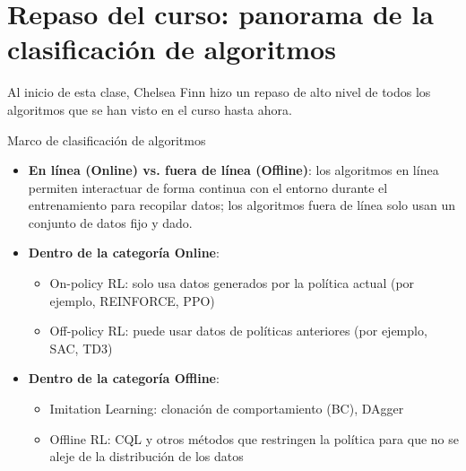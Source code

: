 \section{Repaso del curso: panorama de la clasificación de algoritmos}

Al inicio de esta clase, Chelsea Finn hizo un repaso de alto nivel de todos los algoritmos que se han visto en el curso hasta ahora.

\begin{importantbox}{Marco de clasificación de algoritmos}
\begin{itemize}
    \item \textbf{En línea (Online) vs. fuera de línea (Offline)}: los algoritmos en línea permiten interactuar de forma continua con el entorno durante el entrenamiento para recopilar datos; los algoritmos fuera de línea solo usan un conjunto de datos fijo y dado.
    \item \textbf{Dentro de la categoría Online}:
    \begin{itemize}
        \item On-policy RL: solo usa datos generados por la política actual (por ejemplo, REINFORCE, PPO)
        \item Off-policy RL: puede usar datos de políticas anteriores (por ejemplo, SAC, TD3)
    \end{itemize}
    \item \textbf{Dentro de la categoría Offline}:
    \begin{itemize}
        \item Imitation Learning: clonación de comportamiento (BC), DAgger
        \item Offline RL: CQL y otros métodos que restringen la política para que no se aleje de la distribución de los datos
    \end{itemize}
\end{itemize}
\end{importantbox}

